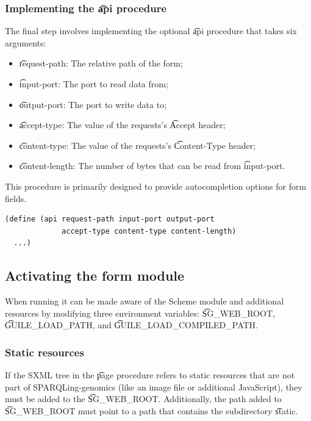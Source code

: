 \subsubsection{Implementing the \t{api} procedure}

  The final step involves implementing the optional \t{api} procedure
  that takes six arguments:
  \begin{itemize}
  \item \t{request-path}:   The relative path of the form;
  \item \t{input-port}:     The port to read data from;
  \item \t{output-port}:    The port to write data to;
  \item \t{accept-type}:    The value of the requests's \t{Accept} header;
  \item \t{content-type}:   The value of the requests's \t{Content-Type} header;
  \item \t{content-length}: The number of bytes that can be read from
    \t{input-port}.
  \end{itemize}

  This procedure is primarily designed to provide autocompletion options
  for form fields.

\begin{siderules}
\begin{verbatim}
(define (api request-path input-port output-port
             accept-type content-type content-length)
  ...)
\end{verbatim}
\end{siderules}

\subsection{Activating the form module}

  When running  it can be made aware of the Scheme module and
  additional resources by modifying three environment variables:
  \t{SG\_WEB\_ROOT}, \t{GUILE\_LOAD\_PATH}, and \t{GUILE\_LOAD\_COMPILED\_PATH}.

\subsubsection{Static resources}

  If the SXML tree in the \t{page} procedure refers to static resources that are
  not part of SPARQLing-genomics (like an image file or additional JavaScript),
  they must be added to the \t{SG\_WEB\_ROOT}.  Additionally, the path added to
  \t{SG\_WEB\_ROOT} must point to a path that contains the subdirectory
  \t{static}.

